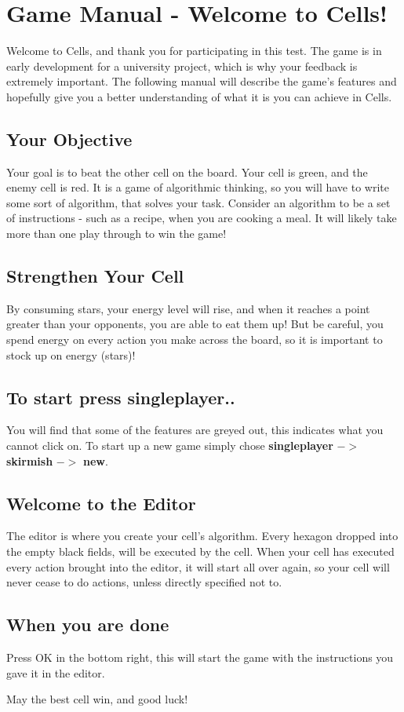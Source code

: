 \section{Game Manual - Welcome to Cells!}

Welcome to Cells, and thank you for participating in this test. The game is in early development for a university project, which is why your feedback is extremely important. The following manual will describe the game's features and hopefully give you a better understanding of what it is you can achieve in Cells.

\subsection{Your Objective}

Your goal is to beat the other cell on the board. Your cell is green, and the enemy cell is red. It is a game of algorithmic thinking, so you will have to write some sort of algorithm, that solves your task. Consider an algorithm to be a set of instructions - such as a recipe, when you are cooking a meal. It will likely take more than one play through to win the game!

\subsection{Strengthen Your Cell}

By consuming stars, your energy level will rise, and when it reaches a point greater than your opponents, you are able to eat them up! But be careful, you spend energy on every action you make across the board, so it is important to stock up on energy (stars)!

\subsection{To start press singleplayer..}

You will find that some of the features are greyed out, this indicates what you cannot click on. To start up a new game simply chose \textbf{singleplayer} $->$ \textbf{skirmish} $->$ \textbf{new}.

\subsection{Welcome to the Editor}

The editor is where you create your cell's algorithm. Every hexagon dropped into the empty black fields, will be executed by the cell. When your cell has executed every action brought into the editor, it will start all over again, so your cell will never cease to do actions, unless directly specified not to.


\subsection{When you are done}

Press OK in the bottom right, this will start the game with the instructions you gave it in the editor. 


May the best cell win, and good luck!